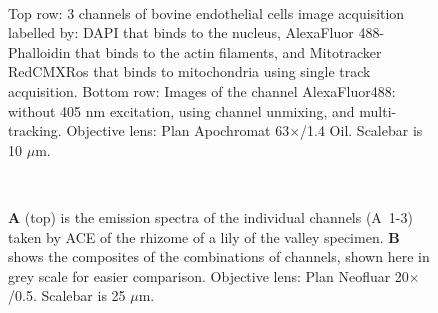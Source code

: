 \begin{figure}[h!]
\\
\caption{Top row: 3 channels of bovine endothelial cells image acquisition labelled by: DAPI that binds to the nucleus, AlexaFluor 488-Phalloidin that binds to the actin filaments, and Mitotracker RedCMXRos that binds to mitochondria using single track acquisition. 
Bottom row: Images of the channel AlexaFluor488: without 405 nm excitation, using channel unmixing, and multi-tracking. 
Objective lens: Plan Apochromat 63$\times$/1.4 Oil. 
Scalebar is 10 $\mu$m.} 
\label{fig:bovendo}
\end{figure}

\begin{figure}[h!]
\centering
{}\hspace{0.1em}
\\
\caption{\textbf{A} (top) is the emission spectra of the individual channels (A~1-3) taken by ACE of the rhizome of a lily of the valley specimen. 
\textbf{B} shows the composites of the combinations of channels, shown here in grey scale for easier comparison. 
Objective lens: Plan Neofluar 20$\times$/0.5. 
Scalebar is 25 $\mu$m.}
\label{fig:autace}
\end{figure}


